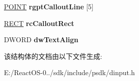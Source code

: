 \begin{DoxyCompactItemize}
\hyperlink{structtag_p_o_i_n_t}{P\+O\+I\+NT} {\bfseries rgpt\+Callout\+Line} \mbox{[}5\mbox{]}
\item 
\mbox{\label{struct___d_i_d_e_v_i_c_e_i_m_a_g_e_i_n_f_o_w_a6e20bdec81422b4d28ea8963ade5de1b}} 
\hyperlink{structtag_r_e_c_t}{R\+E\+CT} {\bfseries rc\+Callout\+Rect}
\item 
\mbox{\label{struct___d_i_d_e_v_i_c_e_i_m_a_g_e_i_n_f_o_w_aee06744ce57ce8a0ae99d76aeba23001}} 
D\+W\+O\+RD {\bfseries dw\+Text\+Align}
\end{DoxyCompactItemize}


该结构体的文档由以下文件生成\+:\begin{DoxyCompactItemize}
\item 
E\+:/\+React\+O\+S-\/0../sdk/include/psdk/dinput.\+h\end{DoxyCompactItemize}
